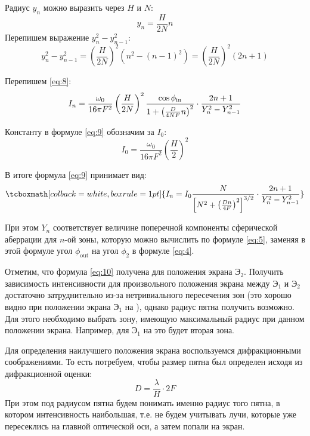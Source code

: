 \documentclass[a4paper, 12pt]{article}
\begin{document}
Радиус $y_n$ можно выразить через $H$ и $N$:
\[
    y_n = \frac{H}{2 N} n
\]
Перепишем выражение $y_n^2-y_{n-1}^2$:
\[
    y_n^2-y_{n-1}^2 = \left( \frac{H}{2 N} \right)^2 (n^2-(n-1)^2) =
    \left( \frac{H}{2 N} \right)^2 (2n+1)
\]

Перепишем \eqref{eq:8}:
\begin{equation}
    I_n = \frac{\omega_0}{16\pi F^2} \left( \frac{H}{2 N} \right)^2
    \frac{\cos\phi_\text{\text{in}}}{1+\left( \frac{D}{4 N F}n \right)^2} \cdot
    \frac{2n+1}{Y_n^2-Y_{n-1}^2}
    \label{eq:9} 
\end{equation}

Константу в формуле \eqref{eq:9} обозначим за $I_0$:
\[
    I_0 = \frac{\omega_0}{16\pi F^2}\left( \frac{H}{2} \right)^2
\]

В итоге формула \eqref{eq:9} принимает вид:
\begin{equation}
    \tcboxmath[colback=white, boxrule=1pt]{I_n = I_0
        \frac{N}{\left[ N^2+\left( \frac{Dn}{4F}
        \right)^2\right]^{3/2}} \cdot
    \frac{2n+1}{Y_n^2-Y_{n-1}^2}}
    \label{eq:10}
\end{equation}

При этом $Y_n$ соответствует величине поперечной компоненты
сферической аберрации для $n$-ой зоны, которую можно вычислить по
формуле \eqref{eq:5}, заменяя в этой формуле угол $\phi_\text{out}$ на
угол $\phi_2$ в формуле \eqref{eq:4}. 

Отметим, что формула \eqref{eq:10} получена для положения экрана
$\text{Э}_2$. Получить зависимость интенсивности для произвольного
положения экрана между $\text{Э}_1$ и $\text{Э}_2$ достаточно
затруднительно из-за нетривиального пересечения зон (это хорошо видно
при положении экрана $\text{Э}_1$ на ), однако радиус пятна
получить возможно. Для этого необходимо выбрать зону, имеющую
максимальный радиус при данном положении экрана. Например, для
$\text{Э}_1$ на  это будет вторая зона.

Для определения наилучшего положения экрана воспользуемся
дифракционными соображениями. То есть потребуем, чтобы размер пятна
был определен исходя
из дифракционной оценки:
\begin{equation}
    D = \frac{\lambda}{H}\cdot 2F
    \label{eq:11}
\end{equation}
При этом под радиусом пятна будем понимать именно радиус того пятна, в котором
интенсивность наибольшая, т.е. не будем учитывать лучи, которые уже
пересеклись на главной оптической оси, а затем попали на экран. 
\end{document}
